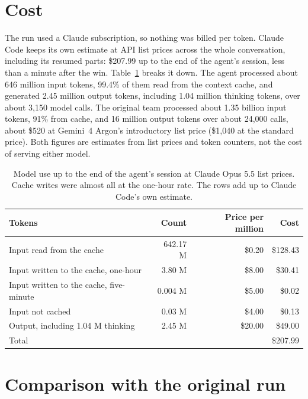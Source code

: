 \documentclass[11pt,a4paper]{article}
\begin{document}
\section{Cost}

The run used a Claude subscription, so nothing was billed per token. Claude Code keeps its own estimate at API list prices across the whole conversation, including its resumed parts: \$207.99 up to the end of the agent's session, less than a minute after the win. Table~\ref{tab:cost} breaks it down. The agent processed about 646 million input tokens, 99.4\% of them read from the context cache, and generated 2.45 million output tokens, including 1.04 million thinking tokens, over about 3,150 model calls. The original team processed about 1.35 billion input tokens, 91\% from cache, and 16 million output tokens over about 24,000 calls, about \$520 at Gemini~4 Argon's introductory list price (\$1,040 at the standard price). Both figures are estimates from list prices and token counters, not the cost of serving either model.

\begin{table}[t]
  \caption{Model use up to the end of the agent's session at Claude Opus 5.5 list prices. Cache writes were almost all at the one-hour rate. The rows add up to Claude Code's own estimate.}
  \label{tab:cost}
  \small
  \begin{tabularx}{\textwidth}{@{}Xrrr@{}}
    \toprule
    \textbf{Tokens} & \textbf{Count} & \textbf{Price per million} & \textbf{Cost} \\
    \midrule
    Input read from the cache & 642.17 M & \$0.20 & \$128.43 \\
    Input written to the cache, one-hour & 3.80 M & \$8.00 & \$30.41 \\
    Input written to the cache, five-minute & 0.004 M & \$5.00 & \$0.02 \\
    Input not cached & 0.03 M & \$4.00 & \$0.13 \\
    Output, including 1.04 M thinking & 2.45 M & \$20.00 & \$49.00 \\
    \midrule
    Total & & & \$207.99 \\
    \bottomrule
  \end{tabularx}
\end{table}

\section{Comparison with the original run}
\end{document}
